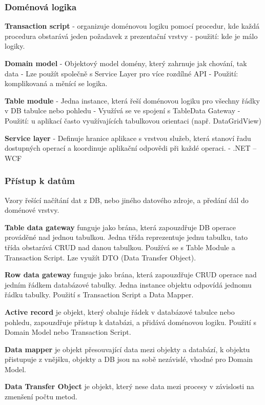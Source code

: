 \subsubsection{Doménová logika}
\textbf{Transaction script} - organizuje doménovou logiku pomocí procedur, kde každá procedura obstarává jeden požadavek z prezentační vrstvy - použití: kde je málo logiky.

\textbf{Domain model} - Objektový model domény, který zahrnuje jak chování, tak data - Lze použít společně s Service Layer pro více rozdílné API - Použití: komplikovaná a měnící se logika.

\textbf{Table module} - Jedna instance, která řeší doménovou logiku pro všechny řádky v DB tabulce nebo pohledu - Využívá se ve spojení s TableData Gateway - Použití: u aplikací často využívajících tabulkovou orientaci (např. DataGridView)

\textbf{Service layer} - Definuje hranice aplikace s vrstvou služeb, která stanoví řadu dostupných operací a koordinuje aplikační odpovědi při každé operaci. - .NET – WCF

\subsubsection{Přístup k datům}
Vzory řešící načítání dat z DB, nebo jiného datového zdroje, a předání dál do doménové vrstvy.

\textbf{Table data gateway} funguje jako brána, která zapouzdřuje DB operace prováděné nad jednou tabulkou. Jedna třída reprezentuje jednu tabulku, tato třída obstarává CRUD nad danou tabulkou. Používá se s Table Module a Transaction Script. Lze využít DTO (Data Transfer Object).

\textbf{Row data gateway} funguje jako brána, která zapouzdřuje CRUD operace nad jedním řádkem databázové tabulky. Jedna instance objektu odpovídá jednomu řádku tabulky. Použití s Transaction Script a Data Mapper.

\textbf{Active record} je objekt, který obaluje řádek v databázové tabulce nebo pohledu, zapouzdřuje přístup k databázi, a přidává doménovou logiku.
Použití s Domain Model nebo Transaction Script.

\textbf{Data mapper} je objekt přesouvající data mezi objekty a databází, k objektu přistupuje z vnějšku, objekty a DB jsou na sobě nezávislé, vhodné pro Domain Model.

\textbf{Data Transfer Object} je objekt, který nese data mezi procesy v závislosti na zmenšení počtu metod.

